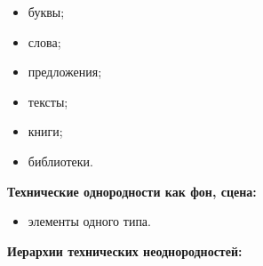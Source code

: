 \begin{itemize}


\item буквы;\\[-14pt]


\item слова;\\[-14pt]


\item предложения;\\[-14pt]


\item тексты;\\[-14pt]


\item книги;\\[-14pt]


\item библиотеки.


\end{itemize}





\textbf{Технические однородности как фон, сцена:}


\begin{itemize}


\item элементы одного типа.


\end{itemize}





\textbf{Иерархии технических неоднородностей:}


